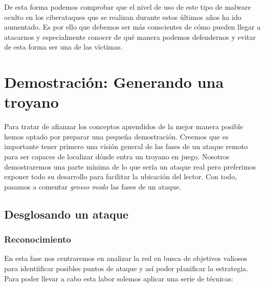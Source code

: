 \documentclass[12pt]{article}
\begin{document}
            De esta forma podemos comprobar que el nivel de uso de este tipo de malware oculto en los ciberataques que se realizan durante estos últimos años ha ido aumentado. Es por ello que debemos ser más conscientes de cómo pueden llegar a atacarnos y especialmente conocer de qué manera podemos defendernos y evitar de esta forma ser una de las víctimas.

    \section{Demostración: Generando una troyano}
        Para tratar de afianzar los conceptos aprendidos de la mejor manera posible hemos optado por preparar una pequeña demostración. Creemos que es importante tener primero una visión general de las fases de un ataque remoto para ser capaces de localizar dónde entra un troyano en juego. Nosotros demostraremos una parte mínima de lo que sería un ataque real pero preferimos exponer todo su desarrollo para facilitar la ubicación del lector. Con todo, pasamos a comentar \textit{grosso modo} las fases de un ataque.

        \subsection{Desglosando un ataque}
            \subsubsection{Reconocimiento}
                En esta fase nos centraremos en analizar la red en busca de objetivos valiosos para identiificar posibles puntos de ataque y así poder planificar la estrategia. Para poder llevar a cabo esta labor solemos aplicar una serie de técnicas:
\end{document}
